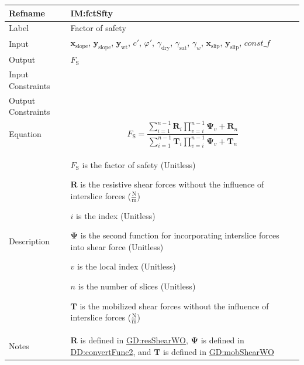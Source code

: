 \documentclass[12pt]{article}
\begin{document}
\medskip
\noindent
\begin{minipage}{\textwidth}
\begin{tabular}{>{\raggedright}p{}>{\raggedright\arraybackslash}p{}}
\toprule \textbf{Refname} & \textbf{IM:fctSfty}
\label{IM:fctSfty}
\\ \midrule
Label & Factor of safety
        
\\ \midrule
Input & ${\symbf{x}_{\text{slope}}}$, ${\symbf{y}_{\text{slope}}}$, ${\symbf{y}_{\text{wt}}}$, $c'$, $φ'$, ${γ_{\text{dry}}}$, ${γ_{\text{sat}}}$, ${γ_{w}}$, ${\symbf{x}_{\text{slip}}}$, ${\symbf{y}_{\text{slip}}}$, $\mathit{const\_f}$
        
\\ \midrule
Output & ${F_{\text{S}}}$
         
\\ \midrule
Input Constraints & 
\\ \midrule
Output Constraints & 
\\ \midrule
Equation & \begin{displaymath}
           {F_{\text{S}}}=\frac{\displaystyle\sum_{i=1}^{n-1}{{\symbf{R}}_{i} \displaystyle\prod_{v=i}^{n-1}{{\symbf{Ψ}}_{v}}}+{\symbf{R}}_{n}}{\displaystyle\sum_{i=1}^{n-1}{{\symbf{T}}_{i} \displaystyle\prod_{v=i}^{n-1}{{\symbf{Ψ}}_{v}}}+{\symbf{T}}_{n}}
           \end{displaymath}
\\ \midrule
Description & \begin{symbDescription}
              \item{${F_{\text{S}}}$ is the factor of safety (Unitless)}
              \item{$\symbf{R}$ is the resistive shear forces without the influence of interslice forces ($\frac{\text{N}}{\text{m}}$)}
              \item{$i$ is the index (Unitless)}
              \item{$\symbf{Ψ}$ is the second function for incorporating interslice forces into shear force (Unitless)}
              \item{$v$ is the local index (Unitless)}
              \item{$n$ is the number of slices (Unitless)}
              \item{$\symbf{T}$ is the mobilized shear forces without the influence of interslice forces ($\frac{\text{N}}{\text{m}}$)}
              \end{symbDescription}
\\ \midrule
Notes & $\symbf{R}$ is defined in \hyperref[GD:resShearWO]{GD:resShearWO}, $\symbf{Ψ}$ is defined in \hyperref[DD:convertFunc2]{DD:convertFunc2}, and $\symbf{T}$ is defined in \hyperref[GD:mobShearWO]{GD:mobShearWO}
        

\end{tabular}
\end{minipage}
\end{document}

